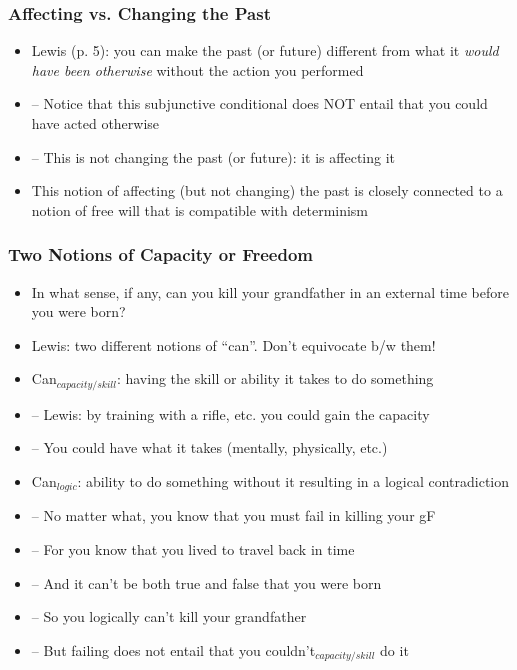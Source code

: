 \begin{frame}
\frametitle{Affecting vs. Changing the Past}

\begin{itemize}[<+->]

\item Lewis (p. 5): you can make the past (or future) different from what it \textit{would have been otherwise} without the action you performed

\item[] -- Notice that this subjunctive conditional does NOT entail that you could have acted otherwise

\item[] -- This is not changing the past (or future): it is affecting it

\item This notion of affecting (but not changing) the past is closely connected to a notion of free will that is compatible with determinism


\end{itemize}
\end{frame}

\begin{frame}
\frametitle{Two Notions of Capacity or Freedom}

\begin{itemize}[<+->]

\item In what sense, if any, can you kill your grandfather in an external time before you were born?

\item Lewis: two different notions of “can”. Don’t equivocate b/w them!

\item Can$_{capacity/skill}$: having the skill or ability it takes to do something
\item[] -- Lewis: by training with a rifle, etc. you could gain the capacity
\item[] -- You could have what it takes (mentally, physically, etc.)

\item Can$_{logic}$: ability to do something without it resulting in a logical contradiction
\item[] -- No matter what, you know that you must fail in killing your gF
\item[] -- For you know that you lived to travel back in time
\item[] -- And it can’t be both true and false that you were born
\item[] -- So you logically can’t kill your grandfather
\item[] -- But failing does not entail that you couldn’t$_{capacity/skill}$ do it

\end{itemize}
\end{frame}

